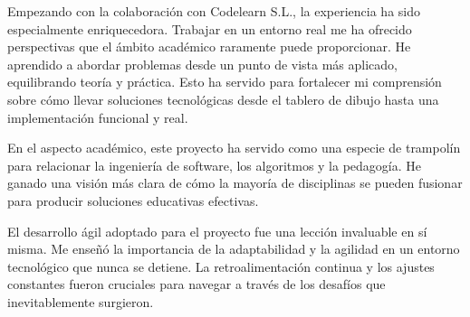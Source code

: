 Empezando con la colaboración con Codelearn S.L., la experiencia ha sido especialmente enriquecedora. Trabajar en un entorno real me ha ofrecido perspectivas que el ámbito académico raramente puede proporcionar. He aprendido a abordar problemas desde un punto de vista más aplicado, equilibrando teoría y práctica. Esto ha servido para fortalecer mi comprensión sobre cómo llevar soluciones tecnológicas desde el tablero de dibujo hasta una implementación funcional y real.

En el aspecto académico, este proyecto ha servido como una especie de trampolín para relacionar la ingeniería de software, los algoritmos y la pedagogía. He ganado una visión más clara de cómo la mayoría de disciplinas se pueden fusionar para  producir soluciones educativas efectivas. 

El desarrollo ágil adoptado para el proyecto fue una lección invaluable en sí misma. Me enseñó la importancia de la adaptabilidad y la agilidad en un entorno tecnológico que nunca se detiene. La retroalimentación continua y los ajustes constantes fueron cruciales para navegar a través de los desafíos que inevitablemente surgieron.

